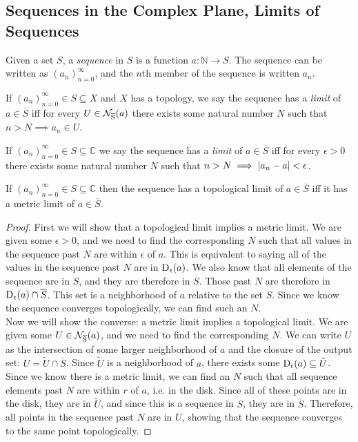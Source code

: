 \documentclass{refbook}
\begin{document}
\subsection{Sequences in the Complex Plane, Limits of Sequences}
\begin{definition}[Sequence]
Given a set $S$, a \emph{sequence} in $S$ is a function $a : \mathbb{N} \longrightarrow S$. The sequence can be written as $(a_n)^\infty_{n=0}$, and the $n$th member of the sequence is written $a_n$.
\end{definition}
\begin{definition}
If $(a_n)^\infty_{n=0} \in S \subseteq X$ and $X$ has a topology, we say the sequence has a \emph{limit} of $a \in \overline{S}$ iff for every $U \in \rnbhd{a}{\overline{S}}$ there exists some natural number $N$ such that $n>N \implies a_n \in U$.
\end{definition}
\begin{definition}
If $(a_n)^\infty_{n=0} \in S \subseteq \mathbb{C}$ we say the sequence has a \emph{limit} of $a \in \overline{S}$ iff for every $\epsilon > 0$ there exists some natural number $N$ such that $n > N \implies \modulus{a_n-a} < \epsilon$.
\end{definition}
\begin{theorem}
If $(a_n)^\infty_{n=0} \in S \subseteq \mathbb{C}$ then the sequence has a topological limit of $a \in \overline{S}$ iff it has a metric limit of $a \in \overline{S}$.
\end{theorem}
\begin{proof}
First we will show that a topological limit implies a metric limit. We are given some $\epsilon > 0$, and we need to find the corresponding $N$ such that all values in the sequence past $N$ are within $\epsilon$ of $a$. This is equivalent to saying all of the values in the sequence past $N$ are in $\disk{a}{\epsilon}$. We also know that all elements of the sequence are in $S$, and they are therefore in $\overline{S}$. Those past $N$ are therefore in $\disk{a}{\epsilon} \cap \overline{S}$. This set is a neighborhood of $a$ relative to the set $S$. Since we know the sequence converges topologically, we can find such an $N$.\\
Now we will show the converse: a metric limit implies a topological limit. We are given some $U \in \rnbhd{a}{\overline{S}}$, and we need to find the corresponding $N$. We can write $U$ as the intersection of some larger neighborhood of $a$ and the closure of the output set: $U = \tilde{U} \cap \overline{S}$. Since $\tilde{U}$ is a neighborhood of $a$, there exists some $\disk{a}{r} \subseteq \tilde{U}$. Since we know there is a metric limit, we can find an $N$ such that all sequence elements past $N$ are within $r$ of $a$, i.e. in the disk. Since all of these points are in the disk, they are in $\tilde{U}$, and since this is a sequence in $S$, they are in $\overline{S}$. Therefore, all points in the sequence past $N$ are in $U$, showing that the sequence converges to the same point topologically.
\end{proof}
\end{document}
